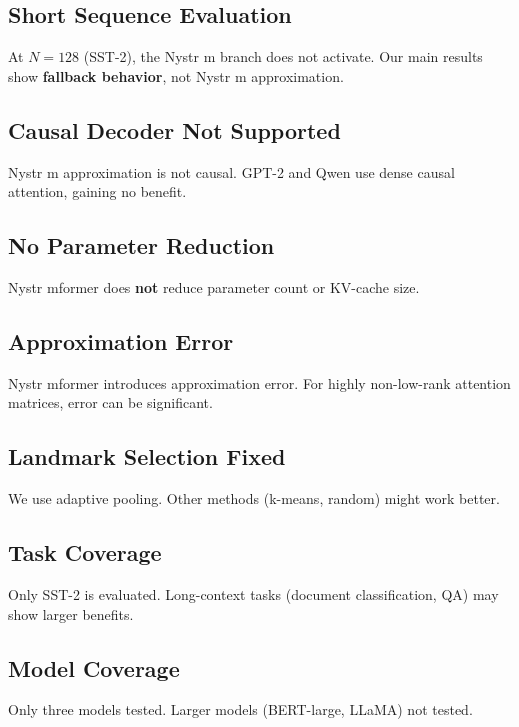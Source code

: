 \subsection{Short Sequence Evaluation}

At $N=128$ (SST-2), the Nystr m branch does not activate. Our main results 
show \textbf{fallback behavior}, not Nystr m approximation.

\subsection{Causal Decoder Not Supported}

Nystr m approximation is not causal. GPT-2 and Qwen use dense causal 
attention, gaining no benefit.

\subsection{No Parameter Reduction}

Nystr mformer does \textbf{not} reduce parameter count or KV-cache size.

\subsection{Approximation Error}

Nystr mformer introduces approximation error. For highly non-low-rank 
attention matrices, error can be significant.

\subsection{Landmark Selection Fixed}

We use adaptive pooling. Other methods (k-means, random) might work better.

\subsection{Task Coverage}

Only SST-2 is evaluated. Long-context tasks (document classification, 
QA) may show larger benefits.

\subsection{Model Coverage}

Only three models tested. Larger models (BERT-large, LLaMA) not tested.


